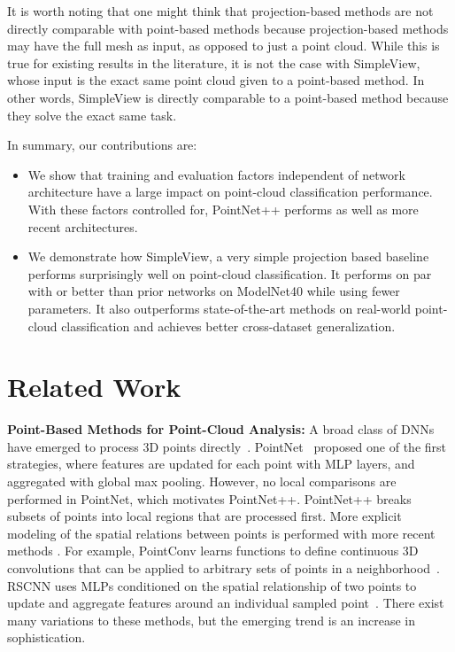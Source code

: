 \documentclass{article}
\newcommand\method{SimpleView}
\begin{document}
It is worth noting that one might think that projection-based methods are not directly comparable with point-based methods because projection-based methods may have the full mesh as input, as opposed to just a point cloud. While this is true for existing results in the literature, it is not the case with \method{}, whose input is the exact same point cloud given to a point-based method. In other words, \method{} is directly comparable to a point-based method because they solve the exact same task. 

In summary, our contributions are:
\vspace{-5mm}
\begin{itemize}[noitemsep]
    \item We show that training and evaluation factors independent of network architecture have a large impact on point-cloud classification performance.  With these factors controlled for, PointNet++ performs as well as more recent architectures.
    \item We demonstrate how \method, a very simple projection based baseline performs surprisingly well on point-cloud classification. It performs on par with or better than prior networks on ModelNet40 while using fewer parameters. It also outperforms state-of-the-art methods on real-world point-cloud classification and achieves better cross-dataset generalization.
\end{itemize}

\section{Related Work}
\label{sec:related_work}
\noindent\textbf{Point-Based Methods for Point-Cloud Analysis:} A broad class of DNNs have emerged to process 3D points directly~\citep{Simonovsky2017ecc,zaheer-deepsets-nips17,klokov-escape-iccv17,xu2018spidercnn,atzmon2018point,wang2018local,li-sonet-cvpr18,accv2018/Groh,ben20183dmfv,xie2018shapecontext,li-pointcnn-ar18,liu2019point2sequence,thomas2019kpconv,komarichev2019cnn,liu2019densepoint,yan2020pointasnl,su2018splatnet,zhang2019linked,liu2019point2sequence,atzmon2018point}. PointNet~\citep{qi-pointnet-cvpr17} proposed one of the first strategies, where features are updated for each point with MLP layers, and aggregated with global max pooling. However, no local comparisons are performed in PointNet, which motivates PointNet++\citep{qi2017pointnetplusplus}. PointNet++ breaks subsets of points into local regions that are processed first. More explicit modeling of the spatial relations between points is performed with more recent methods \citep{li-pointcnn-ar18,liu2019relation,wu2019pointconv}. For example, PointConv learns functions to define continuous 3D convolutions that can be applied to arbitrary sets of points in a neighborhood~\citep{wu2019pointconv}. RSCNN uses MLPs conditioned on the spatial relationship of two points to update and aggregate features around an individual sampled point~\citep{liu2019relation}. There exist many variations to these methods, but the emerging trend is an increase in sophistication. 
\end{document}
